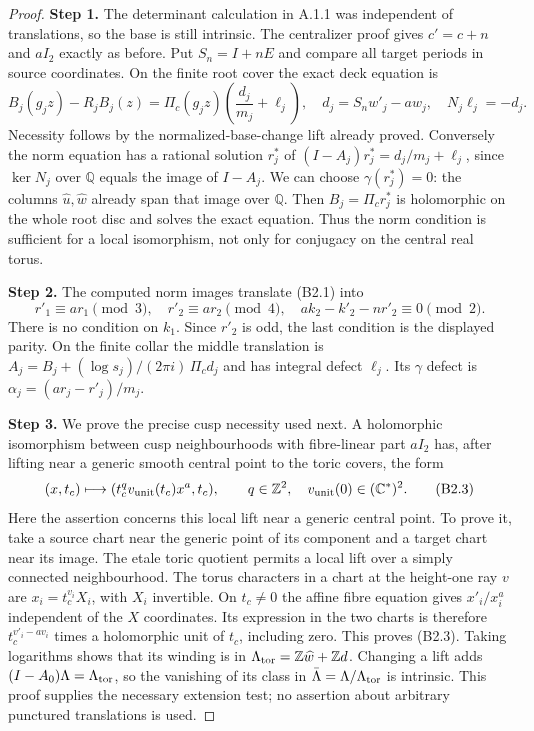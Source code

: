 \begin{proof}
\par\smallskip\noindent\textbf{Step 1.} The determinant calculation in A.1.1 was independent of translations, so the base is still intrinsic. The centralizer proof gives $c'=c+n$ and $aI_2$ exactly as before. Put $S_n=I+nE$ and compare all target periods in source coordinates. On the finite root cover the exact deck equation is
\[
 B_j(g_jz)-R_jB_j(z)=\Pi_c(g_jz)\left(\frac{d_j}{m_j}+\ell_j\right),
 \quad d_j=S_nw'_j-a w_j,
 \quad N_j\ell_j=-d_j.                                      \tag{B2.1}
\]
Necessity follows by the normalized-base-change lift already proved. Conversely the norm equation has a rational solution $r_j^*$ of
$(I-A_j)r_j^*=d_j/m_j+\ell_j$, since $\ker N_j$ over $\mathbb Q$ equals the image of $I-A_j$. We can choose $\gamma(r_j^*)=0$: the columns $\widehat u,\widehat w$ already span that image over $\mathbb Q$. Then $B_j=\Pi_cr_j^*$ is holomorphic on the whole root disc and solves the exact equation. Thus the norm condition is sufficient for a local isomorphism, not only for conjugacy on the central real torus.

\par\smallskip\noindent\textbf{Step 2.} The computed norm images translate (B2.1) into
\[
 r'_1\equiv ar_1\pmod3,\quad r'_2\equiv ar_2\pmod4,
 \quad ak_2-k'_2-nr'_2\equiv0\pmod2.                       \tag{B2.2}
\]
There is no condition on $k_1$. Since $r'_2$ is odd, the last condition is the displayed parity. On the finite collar the middle translation is
$A_j=B_j+(\log s_j)/(2\pi i)\,\Pi_cd_j$ and has integral defect $\ell_j$. Its $\gamma$ defect is
$\alpha_j=(ar_j-r'_j)/m_j$.

\par\smallskip\noindent\textbf{Step 3.} We prove the precise cusp necessity used next. A holomorphic isomorphism between cusp neighbourhoods with fibre-linear part $aI_2$ has, after lifting near a generic smooth central point to the toric covers, the form
\[
 (x,t_c)\longmapsto(t_c^q v_{\rm unit}(t_c)x^a,t_c),\qquad q\in\mathbb Z^2,
 \quad v_{\rm unit}(0)\in(\mathbb C^*)^2.                           \tag{B2.3}
\]
Here the assertion concerns this local lift near a generic central point. To prove it, take a source chart near the generic point of its component and a target chart near its image. The etale toric quotient permits a local lift over a simply connected neighbourhood. The torus characters in a chart at the height-one ray $v$ are $x_i=t_c^{v_i}X_i$, with $X_i$ invertible. On $t_c\ne0$ the affine fibre equation gives $x'_i/x_i^a$ independent of the $X$ coordinates. Its expression in the two charts is therefore $t_c^{v'_i-av_i}$ times a holomorphic unit of $t_c$, including zero. This proves (B2.3). Taking logarithms shows that its winding is in $\Lambda_{\rm tor}=\mathbb Z\widehat w+\mathbb Zd$. Changing a lift adds $(I-A_0)\Lambda=\Lambda_{\rm tor}$, so the vanishing of its class in $\bar\Lambda=\Lambda/\Lambda_{\rm tor}$ is intrinsic. This proof supplies the necessary extension test; no assertion about arbitrary punctured translations is used.


\end{proof}
